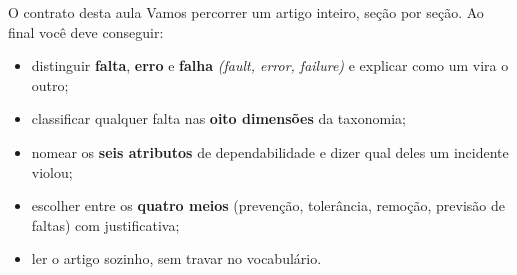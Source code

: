 \documentclass{beamer}
\newcommand{\en}[1]{{\color{depCinza}\textit{#1}}}
\begin{document}
\begin{frame}{O contrato desta aula}
    \footnotesize
    Vamos percorrer um artigo inteiro, se\c{c}\~ao por se\c{c}\~ao. Ao final voc\^e deve conseguir:
    \begin{itemize}
        \item distinguir \textbf{falta}, \textbf{erro} e \textbf{falha} \en{(fault, error, failure)} e explicar como um vira o outro;
        \item classificar qualquer falta nas \textbf{oito dimens\~oes} da taxonomia;
        \item nomear os \textbf{seis atributos} de dependabilidade e dizer qual deles um incidente violou;
        \item escolher entre os \textbf{quatro meios} (preven\c{c}\~ao, toler\^ancia, remo\c{c}\~ao, previs\~ao de faltas) com justificativa;
        \item ler o artigo sozinho, sem travar no vocabul\'ario.
    \end{itemize}
\end{frame}
\end{document}

